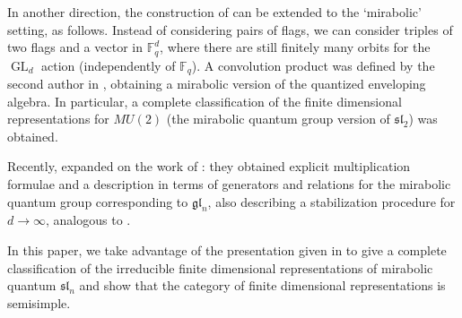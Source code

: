 \documentclass{amsart}
\numberwithin{equation}{section}
\theoremstyle{theorem}
\theoremstyle{definition}
\newcommand{\FF}{\mathbb{F}}
\newcommand{\gl}{\mathfrak{gl}}
\newcommand{\sll}{\mathfrak{sl}}
\newcommand{\GL}{\operatorname{GL}}
\begin{document}
In another direction, the construction of \cite{BLM} can be extended to the `mirabolic' setting, as follows. Instead of considering pairs of flags, %
we can consider triples of two flags and a vector in $\FF_q^d$, where there are still finitely many orbits for the $\GL_d$ action (independently of $\FF_q$). A convolution product was defined by the second author in \cite{R15}, obtaining a mirabolic version of the quantized enveloping algebra. In particular, a complete classification of the finite dimensional representations for $MU(2)$ (the mirabolic quantum group version of $\sll_2$) was obtained. %

Recently, \cite{FZM} expanded on the work of \cite{R15}: they obtained explicit multiplication formulae and a description in terms of generators and relations for the mirabolic quantum group corresponding to $\gl_n$, %
also describing a stabilization procedure for $d\to\infty$, analogous to \cite{BLM}.

In this paper, we take advantage of the presentation given in \cite{FZM} to give a complete classification of the irreducible finite dimensional representations of mirabolic quantum $\sll_n$ and show that the category of finite dimensional representations is semisimple.
\end{document}
